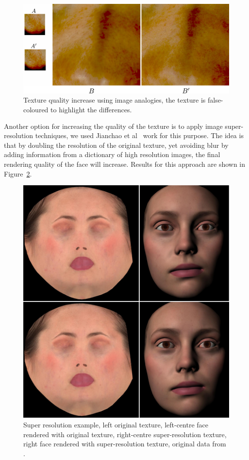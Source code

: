 \documentclass[11pt]{report}
\begin{document}
\begin{figure}[htbp!]
\centering
\includegraphics[width=\textwidth]{img/texture_synthesis}
	\caption{ Texture quality increase using image analogies, the texture is false-coloured to highlight the differences.}
	\label{fig:texture_synthesis}
\end{figure}

Another option for increasing the quality of the texture is to apply image super-resolution techniques, we used Jianchao et al~\cite{Jianchao2010} work for this purpose.
The idea is that by doubling the resolution of the original texture, yet avoiding blur by adding information from a dictionary of high resolution images, the final rendering quality of the face will increase.
Results for this approach are shown in Figure~\ref{fig:emily_super_resolution}.

\begin{figure}[htbp!]
\centering
\includegraphics[width=\textwidth]{img/emily_super_resolution}
	\caption{ Super resolution example, left original texture, left-centre face rendered with original texture, right-centre super-resolution texture, right face rendered with super-resolution texture, original data from \cite{FaceWareWeb}.}
	\label{fig:emily_super_resolution}
\end{figure}
\end{document}
